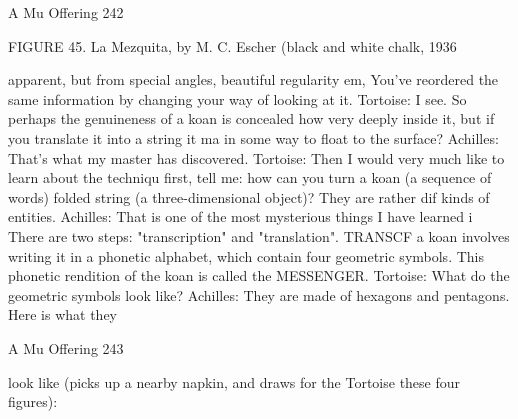 A Mu Offering                                                                          242

        FIGURE 45. La Mezquita, by M. C. Escher (black and white chalk, 1936

    apparent, but from special angles, beautiful regularity em, You've reordered the same
   information by changing your way of looking at it.
Tortoise: I see. So perhaps the genuineness of a koan is concealed how very deeply inside
   it, but if you translate it into a string it ma in some way to float to the surface?
Achilles: That's what my master has discovered.
Tortoise: Then I would very much like to learn about the techniqu first, tell me: how can
   you turn a koan (a sequence of words) folded string (a three-dimensional object)?
   They are rather dif kinds of entities.
Achilles: That is one of the most mysterious things I have learned i There are two steps:
   "transcription" and "translation". TRANSCF a koan involves writing it in a phonetic
   alphabet, which contain four geometric symbols. This phonetic rendition of the koan
   is called the MESSENGER.
Tortoise: What do the geometric symbols look like?
Achilles: They are made of hexagons and pentagons. Here is what they




A Mu Offering                                                                        243

   look like (picks up a nearby napkin, and draws for the Tortoise these four figures):




